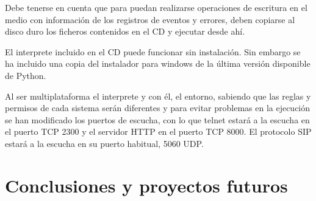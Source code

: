 \documentclass[a4paper,spanish,12pt]{book}
\begin{document}
Debe tenerse en cuenta que para puedan realizarse operaciones de escritura en el medio con información de los registros de eventos y errores, deben copiarse al disco duro los ficheros contenidos en el CD y ejecutar desde ahí. 

El interprete incluido en el CD puede funcionar sin instalación. Sin embargo se ha incluido una copia del instalador para windows de la última versión disponible de Python.

Al ser multiplataforma el interprete y con él, el entorno, sabiendo que las reglas y permisos de cada sistema serán diferentes y para evitar problemas en la ejecución se han modificado los puertos de escucha, con lo que telnet estará a la escucha en el puerto TCP 2300 y el servidor HTTP en el puerto TCP 8000. El protocolo SIP estará a la escucha en su puerto habitual, 5060 UDP.


\chapter{Conclusiones y proyectos futuros}
\end{document}
